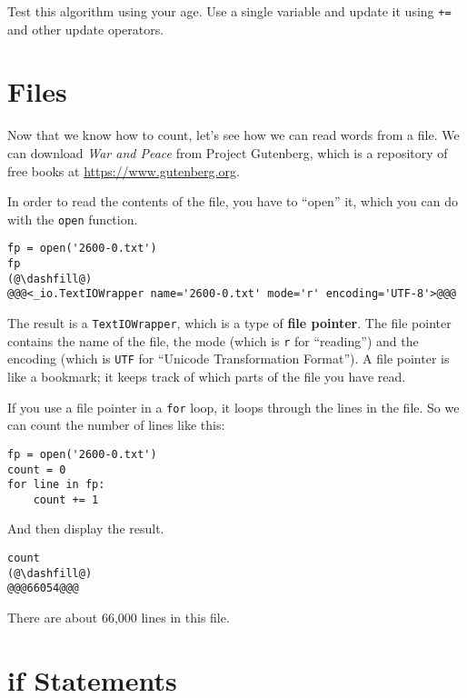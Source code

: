 Test this algorithm using your age. Use a single variable and update it
using \passthrough{\lstinline!+=!} and other update operators.

\hypertarget{files}{%
\section{Files}\label{files}}

Now that we know how to count, let's see how we can read words from a
file. We can download \emph{War and Peace} from Project Gutenberg, which
is a repository of free books at \url{https://www.gutenberg.org}.

In order to read the contents of the file, you have to ``open'' it,
which you can do with the \passthrough{\lstinline!open!} function.

\begin{lstlisting}[]
fp = open('2600-0.txt')
fp
(@\dashfill@)
@@@<_io.TextIOWrapper name='2600-0.txt' mode='r' encoding='UTF-8'>@@@
\end{lstlisting}

The result is a \passthrough{\lstinline!TextIOWrapper!}, which is a type
of \textbf{file pointer}. The file pointer contains the name of the
file, the mode (which is \passthrough{\lstinline!r!} for ``reading'')
and the encoding (which is \passthrough{\lstinline!UTF!} for ``Unicode
Transformation Format''). A file pointer is like a bookmark; it keeps
track of which parts of the file you have read.

If you use a file pointer in a \passthrough{\lstinline!for!} loop, it
loops through the lines in the file. So we can count the number of lines
like this:

\begin{lstlisting}[]
fp = open('2600-0.txt')
count = 0
for line in fp:
    count += 1
\end{lstlisting}

And then display the result.

\begin{lstlisting}[]
count
(@\dashfill@)
@@@66054@@@
\end{lstlisting}

There are about 66,000 lines in this file.

\hypertarget{if-statements}{%
\section{if Statements}\label{if-statements}}

